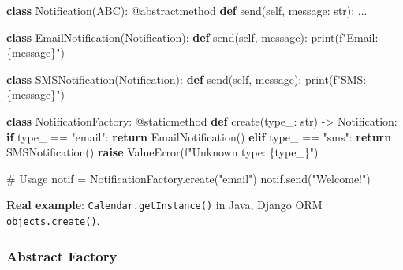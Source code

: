 \documentclass[11pt]{article}
\newenvironment{Shaded}{\begin{snugshade}}{\end{snugshade}}
\newcommand{\AttributeTok}[1]{\textcolor[rgb]{0.16,0.50,0.73}{#1}}
\newcommand{\BuiltInTok}[1]{\textcolor[rgb]{0.50,0.55,0.55}{#1}}
\newcommand{\CommentTok}[1]{\textcolor[rgb]{0.48,0.49,0.49}{#1}}
\newcommand{\ControlFlowTok}[1]{\textcolor[rgb]{0.99,0.74,0.29}{\textbf{#1}}}
\newcommand{\KeywordTok}[1]{\textcolor[rgb]{0.81,0.81,0.76}{\textbf{#1}}}
\newcommand{\NormalTok}[1]{\textcolor[rgb]{0.81,0.81,0.76}{#1}}
\newcommand{\OperatorTok}[1]{\textcolor[rgb]{0.81,0.81,0.76}{#1}}
\newcommand{\PreprocessorTok}[1]{\textcolor[rgb]{0.15,0.68,0.38}{#1}}
\newcommand{\SpecialCharTok}[1]{\textcolor[rgb]{0.24,0.68,0.91}{#1}}
\newcommand{\SpecialStringTok}[1]{\textcolor[rgb]{0.85,0.27,0.33}{#1}}
\newcommand{\StringTok}[1]{\textcolor[rgb]{0.96,0.31,0.31}{#1}}
\newcommand{\VariableTok}[1]{\textcolor[rgb]{0.15,0.68,0.68}{#1}}
\begin{document}

\begin{Shaded}
\begin{Highlighting}[]
\KeywordTok{class}\NormalTok{ Notification(ABC):}
    \AttributeTok{@abstractmethod}
    \KeywordTok{def}\NormalTok{ send(}\VariableTok{self}\NormalTok{, message: }\BuiltInTok{str}\NormalTok{): ...}

\KeywordTok{class}\NormalTok{ EmailNotification(Notification):}
    \KeywordTok{def}\NormalTok{ send(}\VariableTok{self}\NormalTok{, message): }\BuiltInTok{print}\NormalTok{(}\SpecialStringTok{f"Email: }\SpecialCharTok{\{}\NormalTok{message}\SpecialCharTok{\}}\SpecialStringTok{"}\NormalTok{)}

\KeywordTok{class}\NormalTok{ SMSNotification(Notification):}
    \KeywordTok{def}\NormalTok{ send(}\VariableTok{self}\NormalTok{, message): }\BuiltInTok{print}\NormalTok{(}\SpecialStringTok{f"SMS: }\SpecialCharTok{\{}\NormalTok{message}\SpecialCharTok{\}}\SpecialStringTok{"}\NormalTok{)}

\KeywordTok{class}\NormalTok{ NotificationFactory:}
    \AttributeTok{@staticmethod}
    \KeywordTok{def}\NormalTok{ create(type\_: }\BuiltInTok{str}\NormalTok{) }\OperatorTok{{-}\textgreater{}}\NormalTok{ Notification:}
        \ControlFlowTok{if}\NormalTok{ type\_ }\OperatorTok{==} \StringTok{"email"}\NormalTok{:}
            \ControlFlowTok{return}\NormalTok{ EmailNotification()}
        \ControlFlowTok{elif}\NormalTok{ type\_ }\OperatorTok{==} \StringTok{"sms"}\NormalTok{:}
            \ControlFlowTok{return}\NormalTok{ SMSNotification()}
        \ControlFlowTok{raise} \PreprocessorTok{ValueError}\NormalTok{(}\SpecialStringTok{f"Unknown type: }\SpecialCharTok{\{}\NormalTok{type\_}\SpecialCharTok{\}}\SpecialStringTok{"}\NormalTok{)}

\CommentTok{\# Usage}
\NormalTok{notif }\OperatorTok{=}\NormalTok{ NotificationFactory.create(}\StringTok{"email"}\NormalTok{)}
\NormalTok{notif.send(}\StringTok{"Welcome!"}\NormalTok{)}
\end{Highlighting}
\end{Shaded}

\textbf{Real example}: \texttt{Calendar.getInstance()} in Java, Django ORM \texttt{objects.create()}.

\subsubsection{Abstract Factory}\label{abstract-factory}
\end{document}
